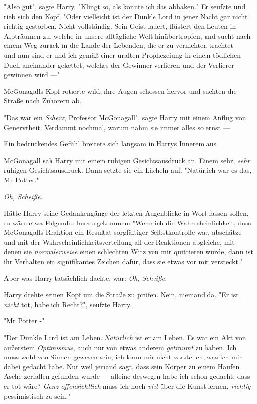 {"Also gut", sagte Harry. "Klingt so, als könnte ich das abhaken." Er seufzte und rieb sich den Kopf. "Oder vielleicht ist der Dunkle Lord in jener Nacht gar nicht richtig gestorben. Nicht vollständig. Sein Geist lauert, flüstert den Leuten in Alpträumen zu, welche in unsere alltägliche Welt hinübertropfen, und sucht nach einem Weg zurück in die Lande der Lebenden, die er zu vernichten trachtet --- und nun sind er und ich gemäß einer uralten Prophezeiung in einem tödlichen Duell aneinander gekettet, welches der Gewinner verlieren und der Verlierer gewinnen wird ---"

McGonagalls Kopf rotierte wild, ihre Augen schossen hervor und suchten die Straße nach Zuhörern ab.

"Das war ein \emph{Scherz}, Professor McGonagall", sagte Harry mit einem Anflug von Genervtheit. Verdammt nochmal, warum nahm sie immer alles so ernst ---

Ein bedrückendes Gefühl breitete sich langsam in Harrys Innerem aus.

McGonagall sah Harry mit einem ruhigen Gesichtsausdruck an. Einem sehr, \emph{sehr} ruhigen Gesichtsausdruck. Dann setzte sie ein Lächeln auf. "Natürlich war es das, Mr Potter."

\emph{Oh, Scheiße.}

Hätte Harry seine Gedankengänge der letzten Augenblicke in Wort fassen sollen, so wäre etwa Folgendes herausgekommen: "Wenn ich die Wahrscheinlichkeit, dass McGonagalls Reaktion ein Resultat sorgfältiger Selbstkontrolle war, abschätze und mit der Wahrscheinlichkeitsverteilung all der Reaktionen abgleiche, mit denen sie \emph{normalerweise} einen schlechten Witz von mir quittieren würde, dann ist ihr Verhalten ein signifikantes Zeichen dafür, dass sie etwas vor mir versteckt."

Aber was Harry tatsächlich dachte, war: \emph{Oh, Scheiße.}

Harry drehte seinen Kopf um die Straße zu prüfen. Nein, niemand da. "Er ist \emph{nicht} tot, habe ich Recht?", seufzte Harry.

"Mr Potter -"

"Der Dunkle Lord ist am Leben. \emph{Natürlich} ist er am Leben. Es war ein Akt von äußerstem \emph{Optimismus}, auch nur von etwas anderem \emph{geträumt} zu haben. Ich muss wohl von Sinnen gewesen sein, ich kann mir nicht vorstellen, was ich mir dabei gedacht habe. Nur weil jemand sagt, dass sein Körper zu einem Haufen Asche zerfallen gefunden wurde --- alleine deswegen habe ich schon gedacht, dass er tot wäre? \emph{Ganz offensichtlich} muss ich noch \emph{viel} über die Kunst lernen, \emph{richtig} pessimistisch zu sein."

}
